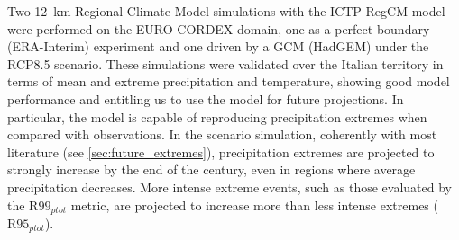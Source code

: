 Two \SI{12}{\kilo\meter} Regional Climate Model simulations with the ICTP RegCM model were performed on the EURO-CORDEX domain, one as a perfect boundary (ERA-Interim) experiment and one driven by a GCM (HadGEM) under the RCP8.5 scenario.
These simulations were validated over the Italian territory in terms of mean and extreme precipitation and temperature, showing good model performance and entitling us to use the model for future projections.
In particular, the model is capable of reproducing precipitation extremes when compared with observations.
In the scenario simulation, coherently with most literature (see \cref{sec:future_extremes}), precipitation extremes are projected to strongly increase by the end of the century, even in regions where average precipitation decreases.
More intense extreme events, such as those evaluated by the $\textrm{R99}_{ptot}$ metric, are projected to increase more than less intense extremes ($\textrm{R95}_{ptot}$).

